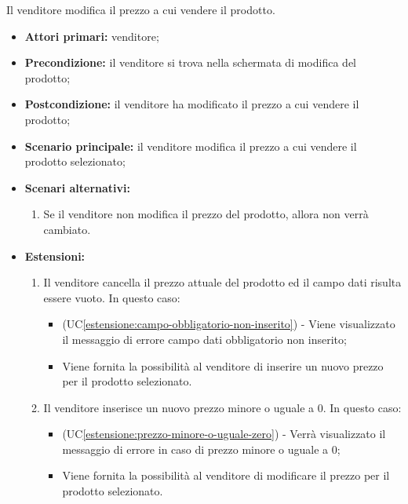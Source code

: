 Il venditore modifica il prezzo a cui vendere il prodotto.
\begin{itemize}
    \item \textbf{Attori primari:} venditore;
    \item \textbf{Precondizione:} il venditore si trova nella schermata di modifica del prodotto;
    \item \textbf{Postcondizione:} il venditore ha modificato il prezzo a cui vendere il prodotto;
    \item \textbf{Scenario principale:} il venditore modifica il prezzo a cui vendere il prodotto selezionato;
    \item \textbf{Scenari alternativi:}
    \begin{enumerate}[label=\lett]
		\item Se il venditore non modifica il prezzo del prodotto, allora non verrà cambiato.
	\end{enumerate}
    \item \textbf{Estensioni:}
    \begin{enumerate}[label=\lett]
    	\item Il venditore cancella il prezzo attuale del prodotto ed il campo dati risulta essere vuoto. In questo caso:
    	\begin{itemize}
    		\item (UC\ref{estensione:campo-obbligatorio-non-inserito}) - Viene visualizzato il messaggio di errore campo dati obbligatorio non inserito;
    		\item Viene fornita la possibilità al venditore di inserire un nuovo prezzo per il prodotto selezionato.
    	\end{itemize}
    	\item Il venditore inserisce un nuovo prezzo minore o uguale a 0. In questo caso:
    	\begin{itemize}
    		\item (UC\ref{estensione:prezzo-minore-o-uguale-zero}) - Verrà visualizzato il messaggio di errore in caso di prezzo minore o uguale a 0;
    		\item Viene fornita la possibilità al venditore di modificare il prezzo per il prodotto selezionato.
    	\end{itemize}
    \end{enumerate}
\end{itemize}

\label{modifica-prodotto.sconto}

